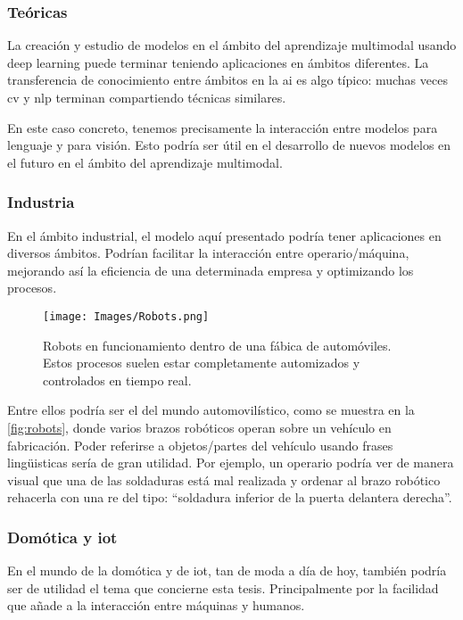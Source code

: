 \subsubsection{Teóricas}
La creación y estudio de modelos en el ámbito del aprendizaje multimodal usando
deep learning puede terminar teniendo aplicaciones en ámbitos diferentes. La
transferencia de conocimiento entre ámbitos en la \gls{ai} es algo típico:
muchas veces \gls{cv} y \gls{nlp} terminan compartiendo técnicas similares.

En este caso concreto, tenemos precisamente la interacción entre modelos para
lenguaje y para visión. Esto podría ser útil en el desarrollo de nuevos modelos
en el futuro en el ámbito del aprendizaje multimodal.

\subsubsection{Industria}
En el ámbito industrial, el modelo aquí presentado podría tener aplicaciones en
diversos ámbitos. Podrían facilitar la interacción entre operario/máquina,
mejorando así la eficiencia de una determinada empresa y optimizando los
procesos.

\begin{figure}[ht]
  \centering
  \texttt{[image: Images/Robots.png]}
  \caption[Robots en fábrica de automóviles]{Robots en funcionamiento dentro de
    una fábica de automóviles. Estos procesos suelen estar completamente
    automizados y controlados en tiempo real.}
  \label{fig:robots}
\end{figure}

Entre ellos podría ser el del mundo automovilístico, como se
muestra en la \vref{fig:robots}, donde varios brazos robóticos operan sobre un
vehículo en fabricación. Poder referirse a objetos/partes del vehículo usando
frases lingüisticas sería de gran utilidad. Por ejemplo, un operario podría ver
de manera visual que una de las soldaduras está mal realizada y ordenar al
brazo robótico rehacerla con una \gls{re} del tipo: ``soldadura inferior de la
puerta delantera derecha''.

\subsubsection{Domótica y \acs*{iot}}
En el mundo de la domótica y de \gls{iot}, tan de moda a día de hoy, también
podría ser de utilidad el tema que concierne esta tesis. Principalmente por la
facilidad que añade a la interacción entre máquinas y humanos.


